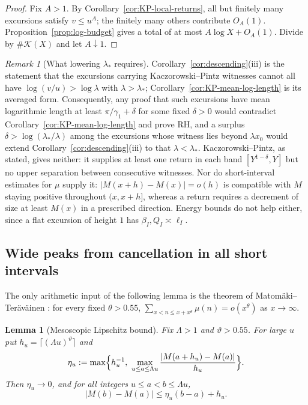 \documentclass[11pt]{amsart}
\numberwithin{equation}{section}
\theoremstyle{plain}
\newtheorem{lemma}[theorem]{Lemma}
\theoremstyle{definition}
\theoremstyle{remark}
\newtheorem{remark}[theorem]{Remark}
\begin{document}
\begin{proof}
Fix $A>1$. By Corollary~\ref{cor:KP-local-returns}, all but finitely many
excursions satisfy $v\le u^A$; the finitely many others contribute $O_A(1)$.
Proposition~\ref{prop:log-budget} gives a total of at most
$A\log X+O_A(1)$. Divide by $\#\mathcal K(X)$ and let $A\downarrow1$.
\end{proof}

\begin{remark}[What lowering $\lambda_*$ requires]
\label{rem:surplus}
Corollary~\ref{cor:descending}(iii) is the statement that the
excursions carrying Kaczorowski--Pintz witnesses cannot all have
$\log(v/u)>\log\lambda$ with $\lambda>\lambda_*$;
Corollary~\ref{cor:KP-mean-log-length} is its averaged form. Consequently,
any proof that such excursions have mean logarithmic length at least
$\pi/\gamma_1+\delta$ for some fixed $\delta>0$ would contradict
Corollary~\ref{cor:KP-mean-log-length} and prove RH, and a surplus
$\delta>\log(\lambda_*/\lambda)$ among the excursions whose witness lies
beyond $\lambda x_0$ would extend Corollary~\ref{cor:descending}(iii) to
that $\lambda<\lambda_*$. Kaczorowski--Pintz, as stated, gives neither: it
supplies at least one return in each band $[Y^{1-\delta},Y]$ but no upper
separation between consecutive witnesses. Nor do short-interval estimates
for $\mu$ supply it: $|M(x+h)-M(x)|=o(h)$ is compatible with $M$ staying
positive throughout $(x,x+h]$, whereas a return requires a decrement of
size at least $M(x)$ in a prescribed direction. Energy bounds do not help
either, since a flat excursion of height $1$ has $\beta_I,Q_I\asymp\ell_I$.
\end{remark}

\subsection*{Wide peaks from cancellation in all short intervals}

The only arithmetic input of the following lemma is the theorem of
Matom\"aki--Ter\"av\"ainen \cite{MatomakiTeravainen2023}: for every fixed
$\theta>0.55$, $\sum_{x<n\le x+x^\theta}\mu(n)=o(x^\theta)$ as $x\to\infty$.

\begin{lemma}[Mesoscopic Lipschitz bound]
\label{lem:meso-lipschitz}
Fix $\Lambda>1$ and $\vartheta>0.55$. For large $u$ put
$h_u=\lceil(\Lambda u)^\vartheta\rceil$ and
\[
\eta_u:=\max\Bigl\{h_u^{-1},\ \max_{u\le a\le\Lambda u}
\frac{|M(a+h_u)-M(a)|}{h_u}\Bigr\}.
\]
Then $\eta_u\to0$, and for all integers $u\le a<b\le\Lambda u$,
\begin{equation}
\label{eq:meso-lipschitz}
|M(b)-M(a)|\le\eta_u(b-a)+h_u .
\end{equation}
\end{lemma}
\end{document}
